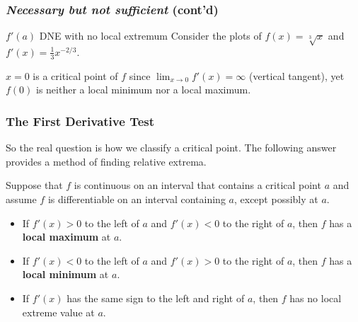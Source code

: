 \documentclass[10pt,t,handout,ignorenonframetext,aspectratio=169]{beamer}
\begin{document}
\begin{frame}
  \frametitle{\textit{Necessary but not sufficient} (cont'd)}
  \begin{exampleblock}{$f'(a)$ DNE with no local extremum}
    Consider the plots of $f(x) = \sqrt[3]{x}$ and $f'(x) = \frac{1}{3} x^{-2/3}$.

    \begin{image}[0.4\linewidth]
    \end{image}
    $x=0$ is a critical point of $f$ since $\lim_{x \to 0}f'(x) = \infty$ (vertical tangent), yet $f(0)$ is neither a local minimum nor a local maximum.
  \end{exampleblock}

\end{frame}

\begin{frame}
  \frametitle{The First Derivative Test}
  So the real question is how we classify a critical point. The
  following answer provides a method of finding relative extrema.

  \begin{thm}
    Suppose that $f$ is continuous on an interval that contains a
    critical point $a$ and assume $f$ is differentiable on an interval
    containing $a$, except possibly at $a$.
    \begin{itemize}
    \item If $f'(x)>0$ to the left of $a$ and $f'(x)<0$ to the right of
      $a$, then $f$ has a \textbf{local maximum} at $a$.
    \item If $f'(x)<0$ to the left of $a$ and $f'(x)>0$ to the right of
      $a$, then $f$ has a \textbf{local minimum} at $a$.
    \item If $f'(x)$ has the same sign to the left and right of $a$,
      then $f$ has no local extreme value at $a$.
    \end{itemize}
  \end{thm}
\end{frame}
\end{document}

